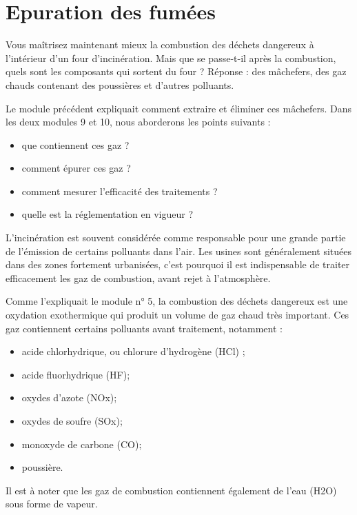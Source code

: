 
\chapter{Epuration des fumées}

Vous maîtrisez maintenant mieux la combustion des déchets dangereux à l’intérieur d’un four d’incinération. Mais que se passe-t-il après la combustion, quels sont les composants qui sortent du four ? Réponse : des mâchefers, des gaz chauds contenant des poussières et d’autres polluants.
\vspace{0.3cm}

Le module précédent expliquait comment extraire et éliminer ces mâchefers.
Dans les deux modules 9 et 10, nous aborderons les points suivants :

\begin{itemize}
    
\item que contiennent ces gaz ?
\item  comment épurer ces gaz ?
\item  comment mesurer l’efficacité des traitements ?
\item  quelle est la réglementation en vigueur ?
\end{itemize}

L’incinération est souvent considérée comme responsable pour une grande partie de l’émission de certains polluants dans l’air. Les usines sont généralement situées dans des zones fortement urbanisées, c’est pourquoi il est indispensable de traiter efficacement les gaz de combustion, avant rejet à l’atmosphère.
\vspace{0.3cm}


Comme l’expliquait le module n° 5, la combustion des déchets dangereux est une oxydation exothermique qui produit un volume de gaz chaud très important. Ces gaz contiennent certains polluants avant traitement, notamment :
\begin{itemize}
\item acide chlorhydrique, ou chlorure d'hydrogène (HCl) ;
\item acide fluorhydrique (HF);
\item oxydes d'azote (NOx);
\item oxydes de soufre (SOx);
\item monoxyde de carbone (CO);
\item poussière.
\end{itemize}
Il est à noter que les gaz de combustion contiennent également de l’eau (H2O) sous forme de vapeur.

